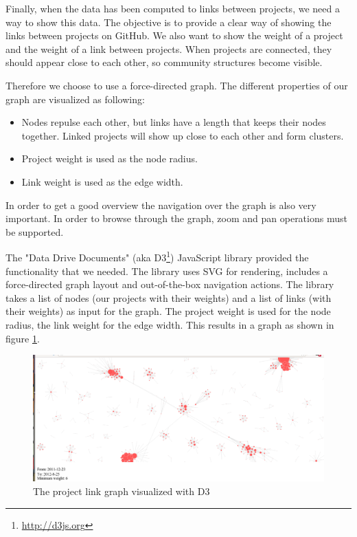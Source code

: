 \documentclass[10pt,a4paper]{article}
\begin{document}
Finally, when the data has been computed to links between projects, we need a way to show this data. The objective is to provide a clear way of showing the links between projects on GitHub. We also want to show the weight of a project and the weight of a link between projects. When projects are connected, they should appear close to each other, so community structures become visible.

Therefore we choose to use a force-directed graph. The different properties of our graph are visualized as following:
\begin{itemize}
    \item Nodes repulse each other, but links have a length that keeps their nodes together. Linked projects will show up close to each other and form clusters.
    \item Project weight is used as the node radius.
    \item Link weight is used as the edge width.
\end{itemize}
In order to get a good overview the navigation over the graph is also very important. In order to browse through the graph, zoom and pan operations must be supported.

The "Data Drive Documents" (aka D3\footnote{\url{http://d3js.org}}) JavaScript library provided the functionality that we needed. The library uses SVG for rendering, includes a force-directed graph layout and out-of-the-box navigation actions. The library takes a list of nodes (our projects with their weights) and a list of links (with their weights) as input for the graph. The project weight is used for the node radius, the link weight for the edge width. This results in a graph as shown in figure \ref{fig:d3-graph}.

\begin{figure}[htb]
    \centering
    \includegraphics[width=\textwidth]{d3-graph}
    \caption{The project link graph visualized with D3}
    \label{fig:d3-graph}
\end{figure}
\end{document}
